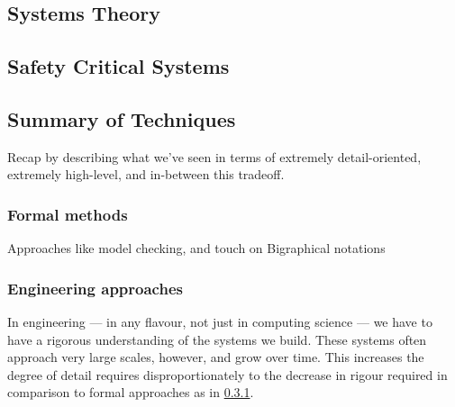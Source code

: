 \subsection{Systems Theory}


\subsection{Safety Critical Systems}


\subsection{Summary of Techniques}
Recap by describing what we've seen in terms of extremely detail-oriented, extremely high-level, and in-between this tradeoff.
  
\subsubsection{Formal methods}\label{sec:review-formal-methods}

Approaches like model checking, and touch on Bigraphical notations
\par

\subsubsection{Engineering approaches}

In engineering --- in any flavour, not just in computing science --- we have to have a rigorous understanding of the systems we build. 
These systems often approach very large scales, however, and grow over time.
This increases the degree of detail requires disproportionately to the decrease in rigour required in comparison to formal approaches as in \ref{sec:review-formal-methods}.
\par

